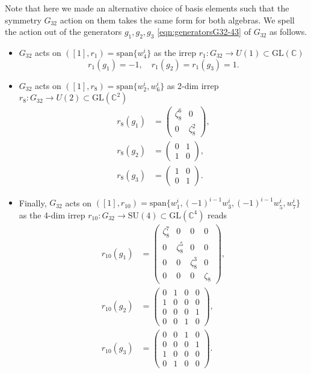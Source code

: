 \documentclass[aps,twocolumn,prx,floatfix,preprintnumbers, nofootinbib,10pt]{revtex4-2}
\numberwithin{equation}{section}
\theoremstyle{definition}
\newcommand{\be}{\begin{equation}}
\newcommand{\ee}{\end{equation}}
\newcommand{\Z}{{\mathbb Z}}
\newcommand{\bC}{{\mathbb C}}
\begin{document}
Note that here we made an alternative choice of basis elements such that
the symmetry $G_{32}$ action on them takes the same form for both algebras. 
We spell the action out of the generators $g_1,g_2,g_3$ \eqref{eqn:generatorsG32-43} of $G_{32}$ as follows.
\begin{itemize}
    \item $G_{32}$ acts on $([1],r_1) = \text{span}\{w^{i}_{4}\}$ as the irrep $r_1: G_{32} \rightarrow U(1)\subset \text{GL}(\bC)$
\be
\label{eqn:1_dim_irrep}
    r_1(g_1)= -1, \quad r_1(g_2)=r_1(g_3)=1.
\ee
\item $G_{32}$ acts on $([1],r_8) = \text{span}\{w^{i}_{2},w^{i}_{6}\}$ as 2-dim irrep $r_8: G_{32} \rightarrow U(2)\subset \text{GL}(\bC^2)$
\be
\label{eqn:2_dim_irrep}
        \begin{split}
    	r_8(g_1) & = \begin{pmatrix}
    		\zeta_{8}^{6} & 0 \\
    		0 & \zeta_{8}^{2}
    	\end{pmatrix}, \\
        r_8(g_2) & = \begin{pmatrix}
    	0 & 1 \\
    	1 & 0
    	\end{pmatrix}, \\
        r_8(g_3) & = \begin{pmatrix}
    	    1 & 0\\
            0 & 1
    	\end{pmatrix}.
    \end{split}
\ee
\item Finally, $G_{32}$ acts on $([1],r_{10}) =\text{span}\{w^{i}_1,(-1)^{i-1}w^{i}_3,(-1)^{i-1}w^{i}_5,w^{i}_7\}$ as the 4-dim irrep $r_{10}: G_{32} \rightarrow \text{SU}(4)\subset \text{GL}(\bC^4)$ reads
\be
    \begin{split}
        \label{eqn:4_dim_irrep}
	r_{10}(g_1) & = \begin{pmatrix}
		\zeta_{8}^{7} & 0 & 0 & 0 \\
		0 & \zeta_{8}^{5} & 0 & 0 \\
		0 & 0 & \zeta_{8}^{3} & 0 \\
		0 & 0 & 0 & \zeta_{8}
	\end{pmatrix}, \\ 
    r_{10}(g_2) & = \begin{pmatrix}
		0 & 1 & 0 & 0 \\
		1 & 0 & 0 & 0 \\
		0 & 0 & 0 & 1 \\
		0 & 0 & 1 & 0
	\end{pmatrix}, \\
    r_{10}(g_3) & = \begin{pmatrix}
	0 & 0 & 1 & 0 \\
	0 & 0 & 0 & 1 \\
	1 & 0 & 0 & 0 \\
	0 & 1 & 0 & 0 
	\end{pmatrix}.
    \end{split}
\ee
\end{itemize}
\end{document}

